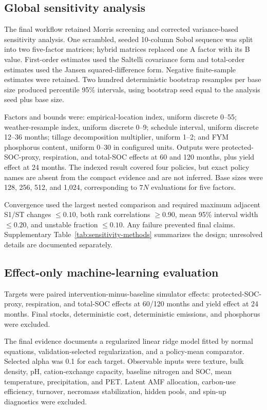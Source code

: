 \documentclass[11pt]{article}
\begin{document}
\subsection{Global sensitivity analysis}

The final workflow retained Morris screening and corrected variance-based sensitivity analysis. One scrambled, seeded 10-column Sobol sequence was split into two five-factor matrices; hybrid matrices replaced one A factor with its B value. First-order estimates used the Saltelli covariance form and total-order estimates used the Jansen squared-difference form. Negative finite-sample estimates were retained. Two hundred deterministic bootstrap resamples per base size produced percentile 95\% intervals, using bootstrap seed equal to the analysis seed plus base size.

Factors and bounds were: empirical-location index, uniform discrete 0--55; weather-resample index, uniform discrete 0--9; schedule interval, uniform discrete 12--36 months; tillage decomposition multiplier, uniform 1--2; and FYM phosphorus content, uniform 0--30 in configured units. Outputs were protected-SOC-proxy, respiration, and total-SOC effects at 60 and 120 months, plus yield effect at 24 months. The indexed result covered four policies, but exact policy names are absent from the compact evidence and are not inferred. Base sizes were 128, 256, 512, and 1,024, corresponding to $7N$ evaluations for five factors.

Convergence used the largest nested comparison and required maximum adjacent S1/ST changes $\leq0.10$, both rank correlations $\geq0.90$, mean 95\% interval width $\leq0.20$, and unstable fraction $\leq0.10$. Any failure prevented final claims. Supplementary Table~\ref{tab:sensitivity-methods} summarizes the design; unresolved details are documented separately.

\subsection{Effect-only machine-learning evaluation}

Targets were paired intervention-minus-baseline simulator effects: protected-SOC-proxy, respiration, and total-SOC effects at 60/120 months and yield effect at 24 months. Final stocks, deterministic cost, deterministic emissions, and phosphorus were excluded.

The final evidence documents a regularized linear ridge model fitted by normal equations, validation-selected regularization, and a policy-mean comparator. Selected alpha was 0.1 for each target. Observable inputs were texture, bulk density, pH, cation-exchange capacity, baseline nitrogen and SOC, mean temperature, precipitation, and PET. Latent AMF allocation, carbon-use efficiency, turnover, necromass stabilization, hidden pools, and spin-up diagnostics were excluded.
\end{document}
